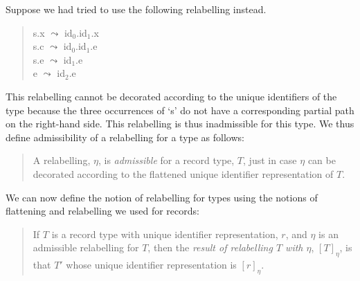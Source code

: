 Suppose we had tried to use the following relabelling instead.
\begin{quote}
s.x $\leadsto$ id$_0$.id$_1$.x \\
s.c $\leadsto$ id$_0$.id$_1$.e \\
s.e $\leadsto$ id$_1$.e \\
e $\leadsto$ id$_2$.e
\end{quote}
This relabelling cannot be decorated according to the unique identifiers
of the type because the three occurrences of `s' do not have a
corresponding partial path on the right-hand side.  This relabelling
is thus inadmissible for this type.  We thus define admissibility of a
relabelling for a type as follows:
\begin{quote}
A relabelling, $\eta$, is \textit{admissible} for a record type, $T$,
just in case $\eta$ can be decorated according to the flattened unique
identifier representation of $T$.

\end{quote}

We can now define the notion of relabelling for types using the
notions of flattening and relabelling we used for records:
\begin{quote}
If $T$ is a record type with unique identifier representation, $r$, and $\eta$ is an admissible relabelling for $T$,
then the \textit{result of relabelling $T$ with $\eta$}, $[T]_\eta$,
is that $T'$ whose unique identifier representation is $[r]_\eta$.
\end{quote}




 
 
 

 

